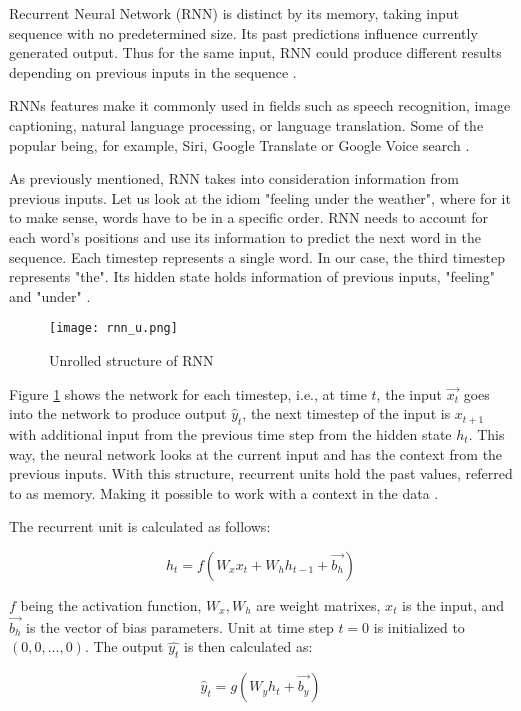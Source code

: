 Recurrent Neural Network (RNN) is distinct by its memory, taking input sequence with no predetermined size. Its past predictions influence currently generated output. Thus for the same input, RNN could produce different results depending on previous inputs in the sequence \cite{rnnDSmedium}.

RNNs features make it commonly used in fields such as speech recognition, image captioning, natural language processing, or language translation. Some of the popular being, for example, Siri, Google Translate or Google Voice search \cite{ibmrnn}.

As previously mentioned, RNN takes into consideration information from previous inputs. Let us look at the idiom "feeling under the weather", where for it to make sense, words have to be in a specific order. RNN needs to account for each word's positions and use its information to predict the next word in the sequence. Each timestep represents a single word. In our case, the third timestep represents "the". Its hidden state holds information of previous inputs, "feeling" and "under" \cite{ibmrnn}.

\begin{figure}[h]
	\centering
    \texttt{[image: rnn\_u.png]}
	\caption{Unrolled structure of RNN \cite{matous}}
	\label{fig:rnn}
\end{figure}


Figure \ref{fig:rnn} shows the network for each timestep, i.e., at time $t$, the input $\vec{x_t}$ goes into the network to produce output $\hat{y}_t$, the next timestep of the input is $x_{t+1}$ with additional input from the previous time step from the hidden state $h_{t}$. This way, the neural network looks at the current input and has the context from the previous inputs.
With this structure, recurrent units hold the past values, referred to as memory. Making it possible to work with a context in the data \cite{rnnin6}.

The recurrent unit is calculated as follows:

\begin{equation}
    {h_t = f(W_{x}x_t + W_{h}h_{t-1}+\vec{b_h})}
\end{equation}

$f$ being the activation function, $W_x,W_h$ are weight matrixes, $x_t$ is the input, and $\vec{b_h}$ is the vector of bias parameters. Unit at time step $t=0$ is initialized to $(0,0,...,0)$. The output $\hat{y_t}$ is then calculated as:

\begin{equation}
    {\hat{y}_t = g(W_{y}h_t + \vec{b_y})}
\end{equation}

